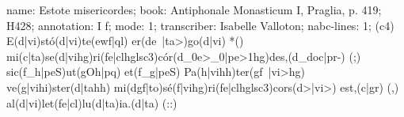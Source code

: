 name: Estote misericordes;
book: Antiphonale Monasticum I, Praglia, p. 419; H428;
annotation: I f;
mode: 1;
transcriber: Isabelle Valloton;
nabc-lines: 1;
(c4)
E(d|vi)stó(d|vi)te(ewf|ql) er(de~|ta>)go(d|vi) *()
mi(c|ta)se(d|vihg)ri(fe|clhglsc3)cór(d_0e>_0|pe>1hg)des,(d_doc|pr-) (;)
sic(f_h|peS)ut(gOh|pq) et(f_g|peS) Pa(h|vihh)ter(gf~|vi>hg) ve(g|vihi)ster(d|tahh) mi(dgf|to)sé(f|vihg)ri(fe|clhglsc3)cors(d>|vi>) est,(c|gr) (,)
al(d|vi)let(fe|cl)lu(d|ta)ia.(d|ta) (::)
